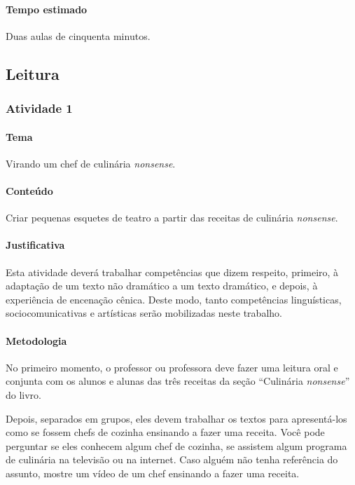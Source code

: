 \documentclass[11pt]{extarticle}
\begin{document}
\paragraph{Tempo estimado} Duas aulas de cinquenta minutos.


\subsection{Leitura}


\subsubsection{Atividade 1}

\paragraph{Tema} Virando um chef de culinária \emph{nonsense}.

\paragraph{Conteúdo} Criar pequenas esquetes de teatro a partir das receitas de culinária \emph{nonsense}.

\paragraph{Justificativa} Esta atividade deverá trabalhar competências que dizem respeito, primeiro,
à adaptação de um texto não dramático a um texto dramático, e depois, à experiência de encenação cênica. 
Deste modo, tanto competências linguísticas, sociocomunicativas e artísticas serão mobilizadas neste trabalho. 

\paragraph{Metodologia} No primeiro momento, o professor ou professora deve fazer uma leitura oral
e conjunta com os alunos e alunas das três receitas da seção ``Culinária \emph{nonsense}'' do livro. 

Depois, separados em grupos, eles devem trabalhar os textos para apresentá-los 
como se fossem chefs de cozinha ensinando a fazer uma receita. 
Você pode perguntar se eles conhecem algum chef de cozinha, 
se assistem algum programa de culinária na televisão ou na internet. 
Caso alguém não tenha referência do assunto, mostre um vídeo 
de um chef ensinando a fazer uma receita. 
\end{document}
